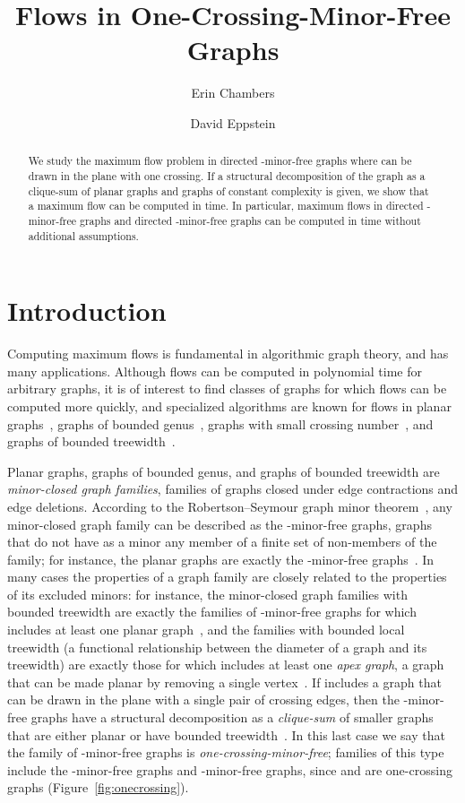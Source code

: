 \documentclass[runningheads]{llncs}
\title{Flows in One-Crossing-Minor-Free Graphs}
\author{Erin Chambers\inst{1} \and David Eppstein\inst{2}}
\institute{\noindent Dept. of Mathematics and Computer Science, Saint Louis University
\and Computer Science Department, University of California, Irvine}
\date{ }
\begin{document}
\maketitle

\begin{abstract}
We study the maximum flow problem in directed -minor-free graphs where  can be drawn in the plane with one crossing. If a structural decomposition of the graph as a clique-sum of planar graphs and graphs of constant complexity is given, we show that a maximum flow can be computed in  time. In particular, maximum flows in directed -minor-free graphs and directed -minor-free graphs can be computed in  time without additional assumptions.
\end{abstract}



\section{Introduction}

Computing maximum flows is fundamental in algorithmic graph theory, and has many applications. Although flows can be computed in polynomial time for arbitrary graphs, it is of interest to find classes of graphs for which flows can be computed more quickly, and specialized algorithms are known for flows in planar graphs~\cite{bk-amfdp-09,ff-mfn-56,h-mfpn-81,hj-oamfu-85,is-mfpn-79,jv-udcffdpn-82,kn-fpgwvc-94,knk-lsfpg-93,mn-fpgms-95,w-mstfpn-97}, graphs of bounded genus~\cite{cen-hfcc-09,cen-mcshc-09}, graphs with small crossing number~\cite{hw-mstfkc-07}, and graphs of bounded treewidth~\cite{hknr-cmfnc-98}.

Planar graphs, graphs of bounded genus, and graphs of bounded treewidth are \emph{minor-closed graph families}, families of graphs closed under  edge contractions and edge deletions.  According to the Robertson--Seymour graph minor theorem~\cite{rs-gm20wc-04}, any minor-closed graph family can be described as the -minor-free graphs, graphs that do not have as a minor any member of a finite set  of non-members of the family; for instance, the planar graphs are exactly the -minor-free graphs~\cite{wagnerk5}. In many cases the properties of a graph family are closely related to the properties of its excluded minors: for instance, the minor-closed graph families with bounded treewidth are exactly the families of -minor-free graphs for which  includes at least one planar graph~\cite{rs-gm5epg-86}, and the families with bounded local treewidth (a functional relationship between the diameter of a graph and its treewidth) are exactly those for which  includes at least one \emph{apex graph}, a graph that can be made planar by removing a single vertex~\cite{e-dtmcgf-00}. If  includes a graph that can be drawn in the plane with a single pair of crossing edges, then the -minor-free graphs have a structural decomposition as a \emph{clique-sum} of smaller graphs that are either planar or have bounded treewidth~\cite{Demaine021.5-approximationfor,rs-onecrossing}. In this last case we say that the family of -minor-free graphs is \emph{one-crossing-minor-free}; families of this type include the -minor-free graphs and -minor-free graphs, since  and  are one-crossing graphs (Figure~\ref{fig:onecrossing}).
\end{document}
